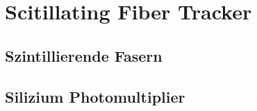 \chapter{Scitillating Fiber Tracker}
\section{Szintillierende Fasern}
\section{Silizium Photomultiplier}
